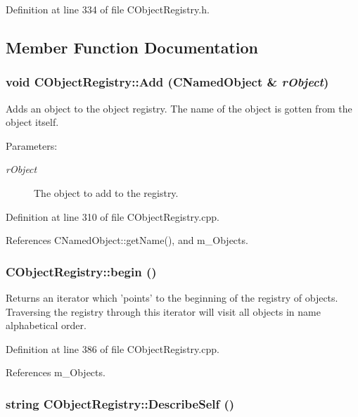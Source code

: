 Definition at line 334 of file CObject\-Registry.h.

\subsection{Member Function Documentation}
\subsubsection{\setlength{\rightskip}{0pt plus 5cm}void CObject\-Registry::Add ({\bf CNamed\-Object} \& {\em r\-Object})}\label{classCObjectRegistry_a3}


Adds an object to the object registry.  The name of the object is gotten from the object itself.\begin{Desc}
\item[Parameters: ]\par
\begin{description}
\item[{\em 
r\-Object}]The object to add to the registry. \end{description}
\end{Desc}


Definition at line 310 of file CObject\-Registry.cpp.

References CNamed\-Object::get\-Name(), and m\_\-Objects.
\subsubsection{ CObject\-Registry::begin ()}\label{classCObjectRegistry_a7}


Returns an iterator which 'points' to the beginning of the  registry of objects. Traversing the registry through this  iterator will visit all objects in name alphabetical order. 

Definition at line 386 of file CObject\-Registry.cpp.

References m\_\-Objects.
\subsubsection{\setlength{\rightskip}{0pt plus 5cm}string CObject\-Registry::Describe\-Self ()\hspace{0.3cm}{\tt  [virtual]}}\label{classCObjectRegistry_a9}


